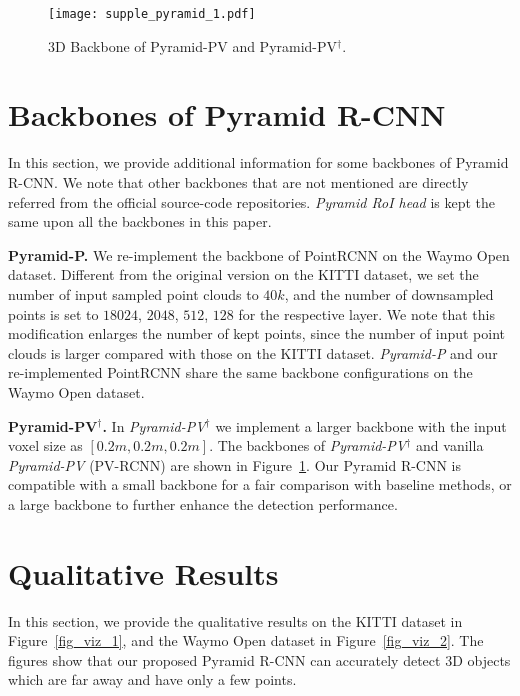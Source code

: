 \documentclass[10pt,twocolumn,letterpaper]{article}
\begin{document}
\begin{figure}[!t]
\centering
\texttt{[image: supple\_pyramid\_1.pdf]}
\caption{3D Backbone of Pyramid-PV and Pyramid-PV$^{\dag}$.}
\label{fig_backbone}
\vspace{-3mm}
\end{figure}

\section{Backbones of Pyramid R-CNN}
In this section, we provide additional information for some backbones of Pyramid R-CNN. We note that other backbones that are not mentioned are directly referred from the official source-code repositories. \textit{Pyramid RoI head} is kept the same upon all the backbones in this paper.

\textbf{Pyramid-P.} We re-implement the backbone of PointRCNN on the Waymo Open dataset. Different from the original version on the KITTI dataset, we set the number of input sampled point clouds to $40k$, and the number of downsampled points is set to $18024$, $2048$, $512$, $128$ for the respective layer. We note that this modification enlarges the number of kept points, since the number of input point clouds is larger compared with those on the KITTI dataset. \textit{Pyramid-P} and our re-implemented PointRCNN share the same backbone configurations on the Waymo Open dataset.    

\textbf{Pyramid-PV$^{\dag}$.} In \textit{Pyramid-PV$^{\dag}$} we implement a larger backbone with the input voxel size as $[0.2m, 0.2m, 0.2m]$. The backbones of \textit{Pyramid-PV$^{\dag}$} and vanilla \textit{Pyramid-PV} (PV-RCNN) are shown in Figure~\ref{fig_backbone}. Our Pyramid R-CNN is compatible with a small backbone for a fair comparison with baseline methods, or a large backbone to further enhance the detection performance.

\section{Qualitative Results}
In this section, we provide the qualitative results on the KITTI dataset in Figure~\ref{fig_viz_1}, and the Waymo Open dataset in Figure~\ref{fig_viz_2}. The figures show that our proposed Pyramid R-CNN can accurately detect 3D objects which are far away and have only a few points.  

\begin{figure*}[!t] \centering   
{}    
\caption{Visualization of detection results on the KITTI dataset. Blue boxes are the ground truth boxes, and red boxes are the boxes predicted by \textit{Pyramid-PV}.}     
\label{fig_viz_1} 
\end{figure*}
\end{document}
